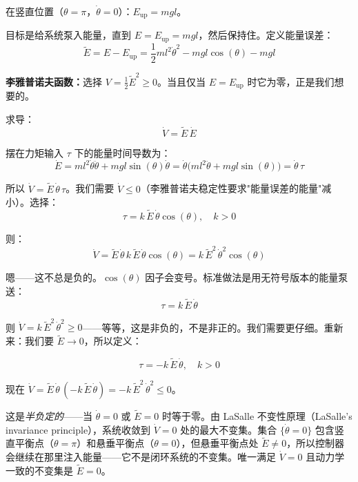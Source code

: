 在竖直位置（$\theta = \pi$，$\dot{\theta} = 0$）：$E_{\text{up}} = mgl$。

目标是给系统泵入能量，直到 $E = E_{\text{up}} = mgl$，然后保持住。定义能量误差：
\begin{equation}
\tilde{E} = E - E_{\text{up}} = \frac{1}{2}ml^2\dot{\theta}^2 - mgl\cos(\theta) - mgl
\end{equation}

\textbf{李雅普诺夫函数：}选择 $V = \frac{1}{2}\tilde{E}^2 \geq 0$。当且仅当 $E = E_{\text{up}}$ 时它为零，正是我们想要的。

求导：
\begin{equation}
\dot{V} = \tilde{E}\,\dot{E}
\end{equation}

摆在力矩输入 $\tau$ 下的能量时间导数为：
\begin{equation}
\dot{E} = ml^2\dot{\theta}\ddot{\theta} + mgl\sin(\theta)\dot{\theta} = \dot{\theta}\bigl(ml^2\ddot{\theta} + mgl\sin(\theta)\bigr) = \dot{\theta}\,\tau
\end{equation}

所以 $\dot{V} = \tilde{E}\,\dot{\theta}\,\tau$。我们需要 $\dot{V} \leq 0$（李雅普诺夫稳定性要求"能量误差的能量"减小）。选择：
\begin{equation}
\tau = k\,\tilde{E}\,\dot{\theta}\cos(\theta), \quad k > 0
\end{equation}

则：
\begin{equation}
\dot{V} = \tilde{E}\,\dot{\theta}\,k\,\tilde{E}\,\dot{\theta}\cos(\theta) = k\,\tilde{E}^2\,\dot{\theta}^2\cos(\theta)
\end{equation}

嗯——这不总是负的。$\cos(\theta)$ 因子会变号。标准做法是用无符号版本的能量泵送：
\begin{equation}
\tau = k\,\tilde{E}\,\dot{\theta}
\end{equation}

则 $\dot{V} = k\,\tilde{E}^2\,\dot{\theta}^2 \geq 0$——等等，这是非负的，不是非正的。我们需要更仔细。重新来：我们要 $\tilde{E} \to 0$，所以定义：

\begin{equation}
\tau = -k\,\tilde{E}\,\dot{\theta}, \quad k > 0
\end{equation}

现在 $\dot{V} = \tilde{E}\,\dot{\theta}\,(-k\,\tilde{E}\,\dot{\theta}) = -k\,\tilde{E}^2\,\dot{\theta}^2 \leq 0$。

这是\textit{半负定的}——当 $\dot{\theta} = 0$ 或 $\tilde{E} = 0$ 时等于零。由 LaSalle 不变性原理（LaSalle's invariance principle），系统收敛到 $\dot{V} = 0$ 处的最大不变集。集合 $\{\dot{\theta} = 0\}$ 包含竖直平衡点（$\theta = \pi$）和悬垂平衡点（$\theta = 0$），但悬垂平衡点处 $\tilde{E} \neq 0$，所以控制器会继续在那里注入能量——它不是闭环系统的不变集。唯一满足 $\dot{V} = 0$ 且动力学一致的不变集是 $\tilde{E} = 0$。

